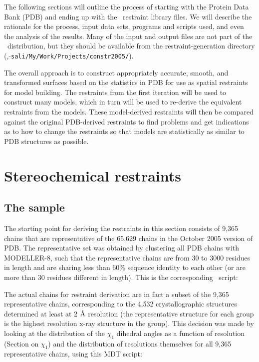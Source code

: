 The following sections will outline the process of starting with the Protein Data Bank (PDB) and ending up with 
the \MODELLER\ restraint library files. We will describe the rationale for the process, input data sets, 
programs and scripts used, and even the analysis of the results. Many of the input and output files are not part 
of the \MDT\ distribution, but they should be available from the restraint-generation directory 
(\eg, {\tt $\tilde{}$sali/My/Work/Projects/constr2005/}).

The overall approach is to construct appropriately accurate, smooth, and transformed surfaces based
on the statistics in PDB for use as spatial restraints for model building. The restraints from the first 
iteration will be used to construct many models, which in turn will be used to re-derive the equivalent 
restraints from the models. These model-derived restraints will then be compared against the original 
PDB-derived restraints to find problems and get indications as to how to change the restraints so that 
models are statistically as similar to PDB structures as possible.

\section{Stereochemical restraints}

\subsection{The sample}

The starting point for deriving the restraints in this section consists of 9,365 chains 
that are representative of the 65,629 chains in the October 2005 version of PDB. The 
representative set was obtained by clustering all PDB chains with MODELLER-8, such that 
the representative chains are from 30 to 3000 residues in length and are sharing less than 
60\% sequence identity to each other (or are more than 30 residues different in length). This
is the corresponding \MODELLER\ script:


The actual chains for restraint derivation are in fact a subset of the 9,365 representative
chains, corresponding to the 4,532 crystallographic structures determined at least at 2 $\mbox{\AA}$ 
resolution (the representative structure for each group is the highest resolution x-ray structure
in the group). This decision was made by looking at the distribution of the $\chi_1$ dihedral angles
as a function of resolution (Section on $\chi_1$) and the distribution of resolutions 
themselves for all 9,365 representative chains, using this MDT script:

